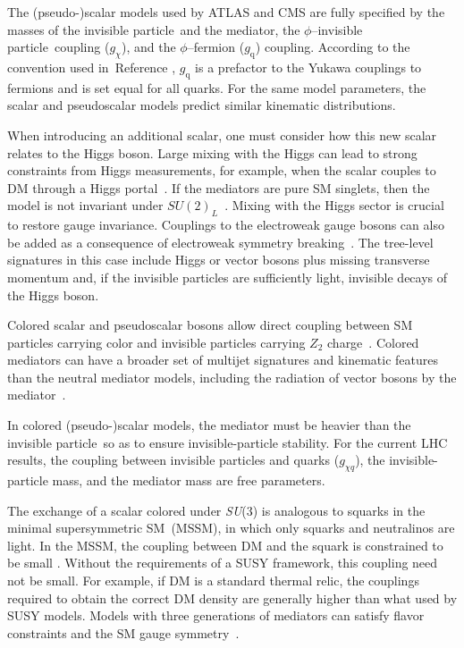 \documentclass{ar-1col}
\newcommand{\chiDM}{\ensuremath{\chi}\xspace}
\newcommand{\IP}{invisible particle}
\newcommand{\gDM}{\ensuremath{g_{\chiDM}}\xspace}
\newcommand{\gdm}{\gDM}
\newcommand{\gdmq}{\ensuremath{g_{\chiDM q}}\xspace}
\newcommand{\gq}{$g_{\mathrm{q}}$\xspace}
\begin{document}
The (pseudo-)scalar models used by ATLAS and CMS are fully
specified by the masses of the \IP\  and the mediator, the
$\phi$--\IP\  coupling (\gdm), and the $\phi$--fermion (\gq) coupling.
According to the convention used in~Reference , \gq is a
prefactor to the Yukawa couplings to fermions and is set equal for
all quarks. For the same model parameters, the scalar and
pseudoscalar models predict similar kinematic distributions.

When introducing an additional scalar, one must consider how this new
scalar relates to the Higgs boson. Large mixing with the Higgs can
lead to strong constraints from Higgs measurements, for example,
when the scalar couples to DM through a Higgs
portal~\cite{Berlin:2014cfa}. If the mediators are pure SM
singlets, then the model is not invariant under
$SU(2)_L$~\cite{Bell:2016ekl}. Mixing
with the Higgs sector is crucial to restore gauge invariance. Couplings to the electroweak
gauge bosons can also be added as a consequence of electroweak
symmetry breaking~\cite{Bauer:2016gys,Englert:2016joy}. The
tree-level signatures in this case include Higgs or vector bosons
plus missing transverse momentum and, if the {\IP}s are
sufficiently light, invisible decays of the Higgs boson.

{Colored scalar and pseudoscalar bosons} allow direct
coupling between SM particles carrying color and {\IP}s carrying $Z_2$
charge~\cite{Bai:2013iqa, Papucci:2014iwa, An:2013xka,
Bell:2012rg}. Colored mediators can have a broader set of
multijet signatures and kinematic features than the neutral
mediator models, including the radiation of vector bosons by the
mediator~\cite{Bell:2012rg}.

In colored (pseudo-)scalar models, the mediator must be heavier
than the \IP\ so as  to ensure invisible-particle stability. For the current LHC results,
the coupling between {\IP}s and quarks (\gdmq), the invisible-particle  mass, and
the mediator mass are free parameters.

The exchange of a scalar colored under \textit{SU}(3) is analogous to
squarks in the minimal supersymmetric SM\ (MSSM), in which only squarks and neutralinos are light.
In the MSSM, the coupling between DM and the squark is constrained
to be small \cite{Abercrombie:2015wmb}. Without the requirements
of a SUSY framework, this coupling need not be small. For example,
if DM is a standard thermal relic, the couplings required to
obtain the correct DM density are generally higher than
what used by SUSY models. Models with three generations of
mediators can satisfy flavor constraints and the SM gauge
symmetry~\cite{Ko:2016zxg}.
\end{document}
